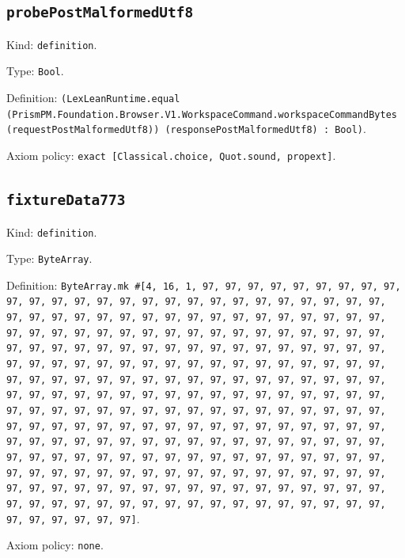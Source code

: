 \documentclass[11pt]{article}
\begin{document}
\subsection*{\texttt{probePostMalformedUtf8}}
\noindent Kind: \texttt{definition}.\par
\noindent Type: \texttt{Bool}.\par
\noindent Definition: \texttt{(LexLeanRuntime.equal (PrismPM.Foundation.Browser.V1.WorkspaceCommand.workspaceCommandBytes (requestPostMalformedUtf8)) (responsePostMalformedUtf8) : Bool)}.\par
\noindent Axiom policy: \texttt{exact [Classical.choice, Quot.sound, propext]}.\par
\subsection*{\texttt{fixtureData773}}
\noindent Kind: \texttt{definition}.\par
\noindent Type: \texttt{ByteArray}.\par
\noindent Definition: \texttt{ByteArray.mk \#[4, 16, 1, 97, 97, 97, 97, 97, 97, 97, 97, 97, 97, 97, 97, 97, 97, 97, 97, 97, 97, 97, 97, 97, 97, 97, 97, 97, 97, 97, 97, 97, 97, 97, 97, 97, 97, 97, 97, 97, 97, 97, 97, 97, 97, 97, 97, 97, 97, 97, 97, 97, 97, 97, 97, 97, 97, 97, 97, 97, 97, 97, 97, 97, 97, 97, 97, 97, 97, 97, 97, 97, 97, 97, 97, 97, 97, 97, 97, 97, 97, 97, 97, 97, 97, 97, 97, 97, 97, 97, 97, 97, 97, 97, 97, 97, 97, 97, 97, 97, 97, 97, 97, 97, 97, 97, 97, 97, 97, 97, 97, 97, 97, 97, 97, 97, 97, 97, 97, 97, 97, 97, 97, 97, 97, 97, 97, 97, 97, 97, 97, 97, 97, 97, 97, 97, 97, 97, 97, 97, 97, 97, 97, 97, 97, 97, 97, 97, 97, 97, 97, 97, 97, 97, 97, 97, 97, 97, 97, 97, 97, 97, 97, 97, 97, 97, 97, 97, 97, 97, 97, 97, 97, 97, 97, 97, 97, 97, 97, 97, 97, 97, 97, 97, 97, 97, 97, 97, 97, 97, 97, 97, 97, 97, 97, 97, 97, 97, 97, 97, 97, 97, 97, 97, 97, 97, 97, 97, 97, 97, 97, 97, 97, 97, 97, 97, 97, 97, 97, 97, 97, 97, 97, 97, 97, 97, 97, 97, 97, 97, 97, 97, 97, 97, 97, 97, 97, 97, 97, 97, 97, 97, 97, 97, 97, 97, 97, 97, 97, 97, 97, 97, 97, 97, 97, 97]}.\par
\noindent Axiom policy: \texttt{none}.\par
\end{document}
